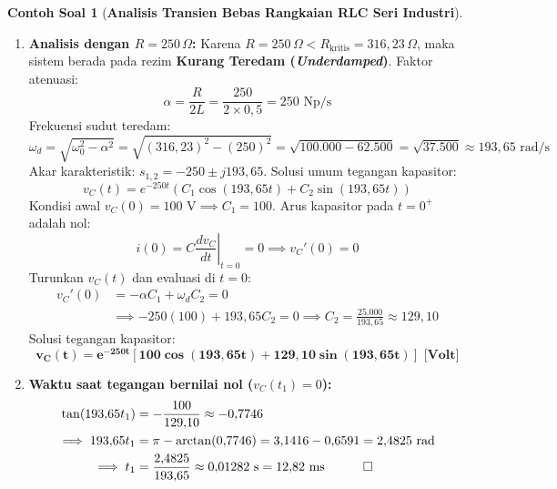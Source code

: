 \documentclass[11pt,a4paper]{article}
\theoremstyle{definition}
\newtheorem{example}{Contoh Soal}[section]
\begin{document}
\begin{example}[\textbf{Analisis Transien Bebas Rangkaian RLC Seri Industri}]
\begin{enumerate}[label=(\alph*), leftmargin=*]
    \item \textbf{Analisis dengan $R = 250\,\Omega$:}
    Karena $R = 250\,\Omega < R_{\text{kritis}} = 316{,}23\,\Omega$, maka sistem berada pada rezim \textbf{Kurang Teredam (\textit{Underdamped})}.
    Faktor atenuasi:
    \begin{equation*}
        \alpha = \frac{R}{2L} = \frac{250}{2 \times 0{,}5} = 250\text{ Np/s}
    \end{equation*}
    Frekuensi sudut teredam:
    \begin{equation*}
        \omega_d = \sqrt{\omega_0^2 - \alpha^2} = \sqrt{(316{,}23)^2 - (250)^2} = \sqrt{100.000 - 62.500} = \sqrt{37.500} \approx 193{,}65\text{ rad/s}
    \end{equation*}
    Akar karakteristik: $s_{1,2} = -250 \pm j 193{,}65$. Solusi umum tegangan kapasitor:
    \begin{equation*}
        v_C(t) = e^{-250 t} \left( C_1 \cos(193{,}65 t) + C_2 \sin(193{,}65 t) \right)
    \end{equation*}
    Kondisi awal $v_C(0) = 100\text{ V} \implies C_1 = 100$.
    Arus kapasitor pada $t = 0^+$ adalah nol:
    \begin{equation*}
        i(0) = C \left. \frac{dv_C}{dt} \right|_{t=0} = 0 \implies v_C'(0) = 0
    \end{equation*}
    Turunkan $v_C(t)$ dan evaluasi di $t = 0$:
    \begin{align*}
        v_C'(0) &= -\alpha C_1 + \omega_d C_2 = 0 \\
        &\implies -250(100) + 193{,}65 C_2 = 0 \implies C_2 = \frac{25.000}{193{,}65} \approx 129{,}10
    \end{align*}
    Solusi tegangan kapasitor:
    \begin{equation*}
        \mathbf{v_C(t) = e^{-250 t} \left[ 100 \cos(193{,}65 t) + 129{,}10 \sin(193{,}65 t) \right]\text{ [Volt]}}
    \end{equation*}

    \item \textbf{Waktu saat tegangan bernilai nol ($v_C(t_1) = 0$):}
    \begin{align*}
        \tan(193{,}65 t_1) &= -\frac{100}{129{,}10} \approx -0{,}7746 \\
        \implies 193{,}65 t_1 &= \pi - \arctan(0{,}7746) = 3{,}1416 - 0{,}6591 = 2{,}4825\text{ rad} \\
        \implies t_1 &= \frac{2{,}4825}{193{,}65} \approx 0{,}01282\text{ s} = 12{,}82\text{ ms} \quad \qed
    \end{align*}
\end{enumerate}
\end{example}
\end{document}
